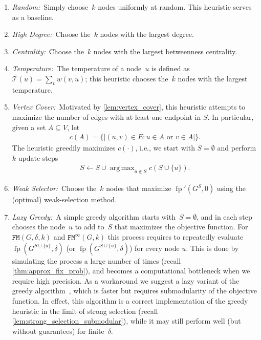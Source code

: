 \documentclass[letterpaper]{article}
\def\dfp{\fp'(G^S,0)}
\DeclareMathOperator*{\argmax}{arg\,max}
\newcommand{\fp}{\operatorname{fp}}
\newcommand{\Temp}{\mathcal{T}}
\newcommand{\NodeActivationMoran}{\texttt{FM}}
\newcommand{\NodeActivationMoranStrong}{\texttt{FM}^{\infty}}
\newcommand{\FitAdv}{\delta}
\newcommand{\Weight}{w}
\begin{document}
\begin{enumerate}
\item \emph{Random:}~Simply choose~$k$ nodes uniformly at random. This heuristic serves as a baseline.
\item \emph{High Degree:}~Choose the~$k$ nodes with the largest degree.
\item \emph{Centrality:}~Choose the~$k$ nodes with the largest betweenness centrality.
\item \emph{Temperature:}~The temperature of a node~$u$ is defined as $\Temp(u)=\sum_{v} \Weight(v,u)$; this heuristic chooses the~$k$ nodes with the largest temperature.
\item \emph{Vertex Cover:}~Motivated by \cref{lem:vertex_cover}, this heuristic attempts to maximize the number of edges with at least one endpoint in $S$.
In particular, given a set $A\subseteq V$, let
\begin{align}
c(A)=\{ |(u,v)\in E\colon u\in A\text{ or }v\in A|  \}.
\end{align}
The heuristic greedily maximizes $c(\cdot)$, i.e.,
we start with $S=\emptyset$ and perform $k$ update steps
\begin{align}
S\gets S\cup  \argmax_{u\not \in S} c(S\cup\{u\}).
\end{align}
\item \emph{Weak Selector:}~Choose the~$k$ nodes that maximize $\dfp$ using the (optimal) weak-selection method.
\item \emph{Lazy Greedy:}~A simple greedy algorithm starts with~$S=\emptyset$, and in each step chooses the node~$u$ to add to~$S$ that maximizes the objective function.
For $\NodeActivationMoran(G,\FitAdv,k)$ and $\NodeActivationMoranStrong(G,k)$ this process requires to repeatedly evaluate $\fp(G^{S\cup\{u\}},\FitAdv)$ (or $\fp(G^{S\cup\{u\}},\FitAdv)$) for every node $u$.
This is done by simulating the process a large number of times (recall \cref{thm:approx_fix_prob}), and becomes a computational bottleneck when we require high precision. As a workaround we suggest a lazy variant of the greedy algorithm~\cite{Minoux1978}, which is faster but requires submodularity of the objective function. In effect, this algorithm is a correct implementation of the greedy heuristic in the limit of strong selection (recall \cref{lem:strong_selection_submodular}), while it may still perform well (but without guarantees) for finite~$\FitAdv$.
\end{enumerate}
\end{document}
